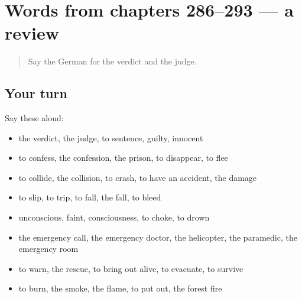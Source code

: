 \section[(dialogue)]{Words from chapters 286–293 — a review}

\label{lesson:GE-R293-review-286-293}



\begin{quote}
Say the German for the verdict and the judge.
\end{quote}

\subsection*{Your turn}
Say these aloud:

\begin{itemize}
\raggedright
  \item the verdict, the judge, to sentence, guilty, innocent
  \item to confess, the confession, the prison, to disappear, to flee
  \item to collide, the collision, to crash, to have an accident, the damage
  \item to slip, to trip, to fall, the fall, to bleed
  \item unconscious, faint, consciousness, to choke, to drown
  \item the emergency call, the emergency doctor, the helicopter, the paramedic, the emergency room
  \item to warn, the rescue, to bring out alive, to evacuate, to survive
  \item to burn, the smoke, the flame, to put out, the forest fire
\end{itemize}

